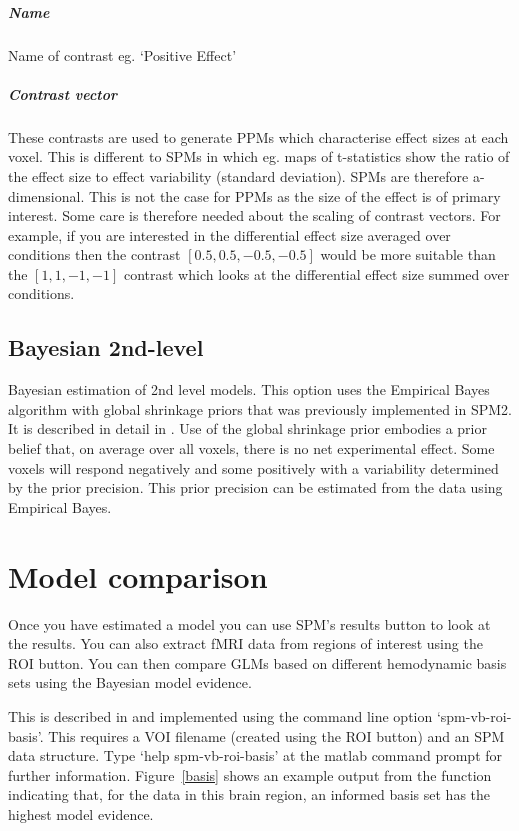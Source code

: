 \documentclass[a4paper,titlepage]{book}
\begin{document}
\subparagraph{Name}
Name of contrast eg. `Positive Effect'


\subparagraph{Contrast vector}
These contrasts are used to generate PPMs which characterise effect sizes at each voxel. This is different to SPMs in which eg. maps of t-statistics show the ratio of the effect size to effect variability (standard deviation). SPMs are therefore a-dimensional. This is not the case for PPMs as the size of the effect is of primary interest. Some care is therefore needed about the scaling of contrast vectors. For example, if you are interested in the differential effect size averaged over conditions then the contrast $[0.5, 0.5, -0.5, -0.5]$ would be more suitable than the $[1, 1, -1, -1]$ contrast which looks at the differential effect size summed over conditions. 


\subsection{Bayesian 2nd-level}
Bayesian estimation of 2nd level models. This option uses the Empirical Bayes algorithm with global shrinkage priors that was previously implemented in SPM2. It is described in detail in \cite{karl_posterior}.
Use of the global shrinkage prior embodies a prior belief that, on average over all voxels, there is no net experimental effect. Some voxels will respond negatively and some positively with a variability determined by the prior precision. This prior precision can be estimated from the data using Empirical Bayes. 


\section{Model comparison}

Once you have estimated a model you can use SPM's results button
to look at the results. You can also extract fMRI data from 
regions of interest using the ROI button. You 
can then compare GLMs based on different hemodynamic basis sets 
using the Bayesian model evidence. 

This is described in \cite{vb4} and implemented 
using the command line option `spm-vb-roi-basis'. This 
requires a VOI filename (created using the ROI button) and an SPM
data structure. Type `help spm-vb-roi-basis' at the matlab command 
prompt for further information. Figure~\ref{basis} shows an 
example output from the function indicating that, for the data in 
this brain region, an informed basis set has the highest model evidence.
\end{document}
